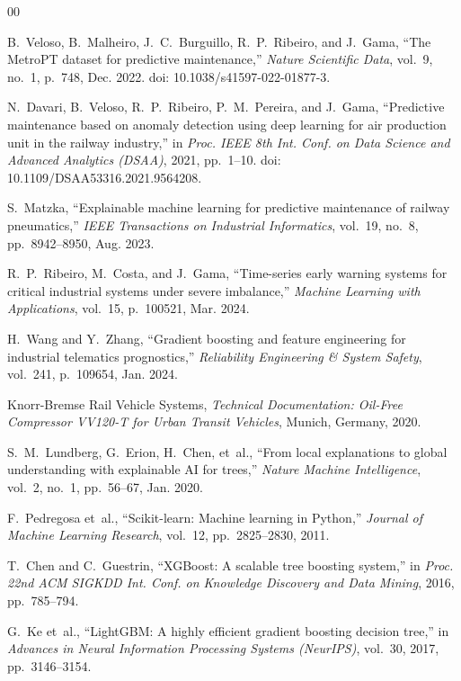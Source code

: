 \documentclass[10pt,twocolumn,a4paper]{article}
\begin{document}
\begin{thebibliography}{00}

B.~Veloso, B.~Malheiro, J.~C.~Burguillo, R.~P.~Ribeiro, and J.~Gama,
``The MetroPT dataset for predictive maintenance,''
\emph{Nature Scientific Data}, vol.~9, no.~1, p.~748, Dec. 2022.
doi: 10.1038/s41597-022-01877-3.

N.~Davari, B.~Veloso, R.~P.~Ribeiro, P.~M.~Pereira, and J.~Gama,
``Predictive maintenance based on anomaly detection using deep learning for air production unit in the railway industry,''
in \emph{Proc. IEEE 8th Int. Conf. on Data Science and Advanced Analytics (DSAA)}, 2021, pp.~1--10.
doi: 10.1109/DSAA53316.2021.9564208.

S.~Matzka,
``Explainable machine learning for predictive maintenance of railway pneumatics,''
\emph{IEEE Transactions on Industrial Informatics}, vol.~19, no.~8, pp.~8942--8950, Aug. 2023.

R.~P.~Ribeiro, M.~Costa, and J.~Gama,
``Time-series early warning systems for critical industrial systems under severe imbalance,''
\emph{Machine Learning with Applications}, vol.~15, p.~100521, Mar. 2024.

H.~Wang and Y.~Zhang,
``Gradient boosting and feature engineering for industrial telematics prognostics,''
\emph{Reliability Engineering \& System Safety}, vol.~241, p.~109654, Jan. 2024.

Knorr-Bremse Rail Vehicle Systems,
\emph{Technical Documentation: Oil-Free Compressor VV120-T for Urban Transit Vehicles},
Munich, Germany, 2020.

S.~M.~Lundberg, G.~Erion, H.~Chen, et~al.,
``From local explanations to global understanding with explainable AI for trees,''
\emph{Nature Machine Intelligence}, vol.~2, no.~1, pp.~56--67, Jan. 2020.

F.~Pedregosa et~al.,
``Scikit-learn: Machine learning in Python,''
\emph{Journal of Machine Learning Research}, vol.~12, pp.~2825--2830, 2011.

T.~Chen and C.~Guestrin,
``XGBoost: A scalable tree boosting system,''
in \emph{Proc. 22nd ACM SIGKDD Int. Conf. on Knowledge Discovery and Data Mining}, 2016, pp.~785--794.

G.~Ke et~al.,
``LightGBM: A highly efficient gradient boosting decision tree,''
in \emph{Advances in Neural Information Processing Systems (NeurIPS)}, vol.~30, 2017, pp.~3146--3154.

\end{thebibliography}
\end{document}
